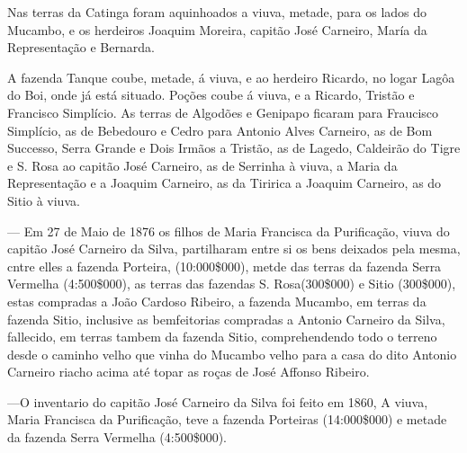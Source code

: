 Nas terras da Catinga foram aquinhoados a viuva, metade, para os lados do Mucambo, e os herdeiros Joaquim Moreira, capitão José Carneiro, María da Representação e Bernarda.

A fazenda Tanque coube, metade, á viuva, e ao herdeiro Ricardo, no logar Lagôa do Boi,
onde já está situado. Poções coube á viuva, e a Ricardo, Tristão e Francisco Simplício. As terras de Algodões e Genipapo ficaram para Fraucisco Simplício, as de Bebedouro e Cedro para Antonio Alves Carneiro, as de Bom Successo, Serra Grande e Dois Irmãos a Tristão, as de Lagedo, Caldeirão do Tigre e S. Rosa ao capitão José Carneiro, as de Serrinha à viuva, a Maria da Representação e a Joaquim Carneiro, as da Tiririca a Joaquim Carneiro, as do Sitio à viuva.

— Em 27 de Maio de 1876 os filhos de Maria Francisca da Purificação, viuva do capitão
José Carneiro da Silva, partilharam entre si os bens deixados pela mesma, cntre elles a fazenda Porteira, (10:000\$000), metde das terras da fazenda Serra Vermelha (4:500\$000), as terras das fazendas S. Rosa(300\$000) e Sitio (300\$000), estas compradas a João Cardoso Ribeiro, a fazenda Mucambo, em terras da fazenda Sitio, inclusive as bemfeitorias compradas a Antonio Carneiro da Silva, fallecido, em terras tambem da fazenda Sitio, comprehendendo todo o terreno desde o caminho velho que vinha do Mucambo velho para a casa do dito Antonio Carneiro riacho acima até topar as roças de José Affonso Ribeiro.

—O inventario do capitão José Carneiro da Silva foi feito em 1860, A viuva, Maria Francisca da Purificação, teve a fazenda Porteiras (14:000\$000) e metade da fazenda Serra Vermelha (4:500\$000).


